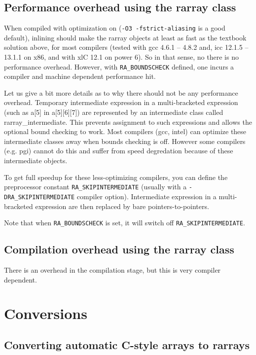 \documentclass[11pt,twoside]{article}
\begin{document}
\subsection{Performance overhead using the rarray class}

When compiled with optimization on (\texttt{-O3 -fstrict-aliasing} is a good default), inlining should make the rarray objects at least as fast as the textbook solution above, for most compilers (tested with gcc 4.6.1 -- 4.8.2 and, icc 12.1.5 -- 13.1.1 on x86, and with xlC 12.1 on power 6).
So in that sense, no there is no performance overhead.  However, with \texttt{{\tt RA\_BOUNDSCHECK}} defined, one incurs a compiler and machine dependent performance hit.

Let us give a bit more details as to why there should not be any performance overhead. Temporary intermediate expression in a multi-bracketed expression (such as a[5] in a[5][6][7]) are represented by an intermediate class called rarray\_intermediate. This prevents assignment to such expressions and allows the optional bound checking to work.  Most compilers (gcc, intel) can optimize these intermediate classes away when bounds checking is off. However
some compilers (e.g. pgi) cannot do this and suffer from speed degredation because of these intermediate objects.

To get full speedup for these less-optimizing compilers, you can define the preprocessor constant \texttt{RA\_SKIPINTERMEDIATE} (usually with a \texttt{-DRA\_SKIPINTERMEDIATE} compiler option).  Intermediate expression in a multi-bracketed expression are then replaced by bare pointers-to-pointers.

Note that when \texttt{RA\_BOUNDSCHECK} is set, it will switch off \texttt{RA\_SKIPINTERMEDIATE}.

\subsection{Compilation overhead using the rarray class}

There is an overhead in the compilation stage, but this is very compiler dependent.

\section{Conversions}

\subsection{Converting automatic C-style arrays to rarrays}
\end{document}
